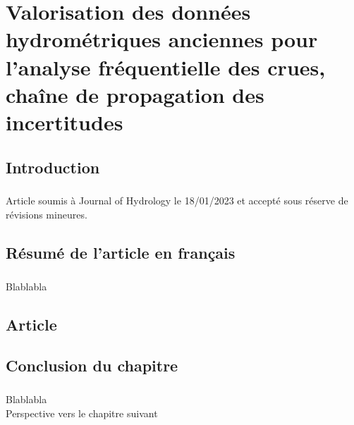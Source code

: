 \chapter{Valorisation des données hydrométriques anciennes pour l’analyse fréquentielle des crues, chaîne de propagation des incertitudes}
\label{chap:ch3}
\newpage

\section{Introduction}

\paragraph{} Article soumis à Journal of Hydrology le 18/01/2023 et accepté sous réserve de révisions mineures.

\section{Résumé de l'article en français}
	\paragraph{} Blablabla
	
\section{Article}




\section{Conclusion du chapitre}

	\paragraph{} Blablabla\\
	Perspective vers le chapitre suivant